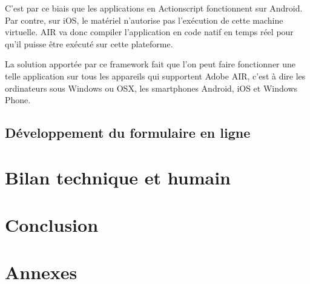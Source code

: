 \documentclass[11pt, a4paper, twoside]{report}
\newcommand\doubleblankpage{%
    \null
    \thispagestyle{empty}%
    \addtocounter{page}{-1}%
    \newpage%
    \null
    \thispagestyle{empty}%
    \addtocounter{page}{-1}%
    \newpage%
}
\begin{document}
C'est par ce biais que les applications en Actionscript fonctionnent sur Android. Par contre, sur iOS, le matériel n'autorise pas l'exécution de cette machine virtuelle. AIR va donc compiler l'application en code natif en temps réel pour qu'il puisse être exécuté sur cette plateforme.

La solution apportée par ce framework fait que l'on peut faire fonctionner une telle application sur tous les appareils qui supportent Adobe AIR, c'est à dire les ordinateurs sous Windows ou OSX, les smartphones Android, iOS et Windows Phone.

\section{Développement du formulaire en ligne}



\chapter{Bilan technique et humain}

\chapter{Conclusion}

\chapter*{Annexes}




\doubleblankpage

\end{document}
